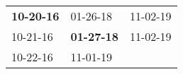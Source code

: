 \begin{supertabular}{p{0.33\columnwidth}p{0.33\columnwidth}p{0.33\columnwidth}}
 \textbf{10-20-16\textsuperscript{}} &           01-26-18\textsuperscript{} &  11-02-19\textsuperscript{} \\
          10-21-16\textsuperscript{} &  \textbf{01-27-18\textsuperscript{}} &  11-02-19\textsuperscript{} \\
          10-22-16\textsuperscript{} &           11-01-19\textsuperscript{} &                             \\
\end{supertabular}
